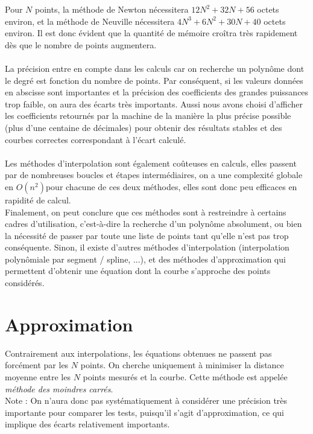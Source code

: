 \documentclass{report}
\begin{document}
      Pour $N$ points, la méthode de Newton nécessitera $12 N^{2}+32N+56$ octets environ, et la méthode de Neuville nécessitera $4 N^{3} + 6 N^{2} + 30N +40$ octets environ. Il est donc évident que la quantité de mémoire croîtra très rapidement dès que le nombre de points augmentera.\\ \\
      
      La précision entre en compte dans les calculs car on recherche un polynôme dont le degré est fonction du nombre de points. Par conséquent, si les valeurs données en abscisse sont importantes et la précision des coefficients des grandes puissances trop faible, on aura des écarts très importants. Aussi nous avons choisi d'afficher les coefficients retournés par la machine de la manière la plus précise possible (plus d'une centaine de décimales) pour obtenir des résultats stables et des courbes correctes correspondant à l'écart calculé.\\ \\
      
      Les méthodes d'interpolation sont également coûteuses en calculs, elles passent par de nombreuses boucles et étapes intermédiaires, on a une complexité globale en $O(n^2)$pour chacune de ces deux méthodes, elles sont donc peu efficaces en rapidité de calcul. \\
      Finalement, on peut conclure que ces méthodes sont à restreindre à certains cadres d'utilisation, c'est-à-dire la recherche d'un polynôme absolument, ou bien la nécessité de passer par toute une liste de points tant qu'elle n'est pas trop conséquente. Sinon, il existe d'autres méthodes d'interpolation (interpolation polynômiale par segment / spline, ...), et des méthodes d'approximation qui permettent d'obtenir une équation dont la courbe s'approche des points considérés.
      
  \chapter{Approximation}
    Contrairement aux interpolations, les équations obtenues ne passent pas forcément par les $N$ points. On cherche uniquement à minimiser la distance moyenne entre les $N$ points mesurés et la courbe. Cette méthode est appelée \textit{méthode des moindres carrés}.\\
    Note : On n'aura donc pas systématiquement à considérer une précision très importante pour comparer les tests, puisqu'il s'agit d'approximation, ce qui implique des écarts relativement importants.
\end{document}
